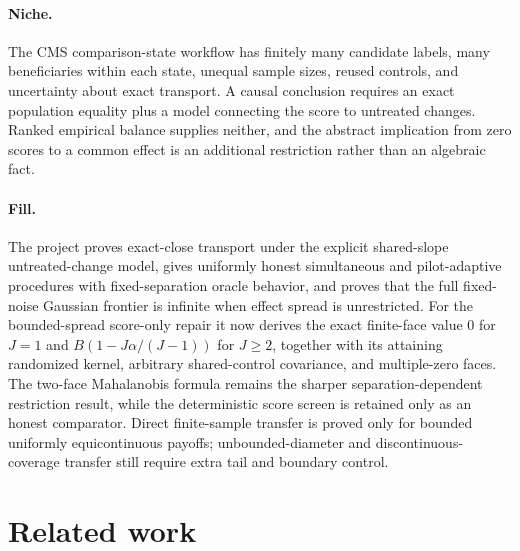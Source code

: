 \documentclass{article}
\begin{document}
\paragraph{Niche.} The CMS comparison-state workflow has finitely many candidate labels, many beneficiaries within each state, unequal sample sizes, reused controls, and uncertainty about exact transport. A causal conclusion requires an exact population equality plus a model connecting the score to untreated changes. Ranked empirical balance supplies neither, and the abstract implication from zero scores to a common effect is an additional restriction rather than an algebraic fact.

\paragraph{Fill.} The project proves exact-close transport under the explicit shared-slope untreated-change model, gives uniformly honest simultaneous and pilot-adaptive procedures with fixed-separation oracle behavior, and proves that the full fixed-noise Gaussian frontier is infinite when effect spread is unrestricted. For the bounded-spread score-only repair it now derives the exact finite-face value \(0\) for \(J=1\) and \(B(1-J\alpha/(J-1))\) for \(J\geq2\), together with its attaining randomized kernel, arbitrary shared-control covariance, and multiple-zero faces. The two-face Mahalanobis formula remains the sharper separation-dependent restriction result, while the deterministic score screen is retained only as an honest comparator. Direct finite-sample transfer is proved only for bounded uniformly equicontinuous payoffs; unbounded-diameter and discontinuous-coverage transfer still require extra tail and boundary control.

\section{Related work}
\end{document}
